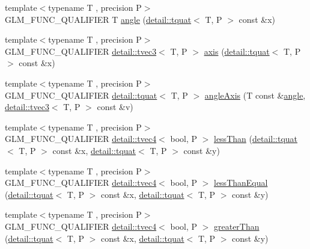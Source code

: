 \begin{DoxyCompactItemize}
\item 
{\footnotesize template$<$typename T , precision P$>$ }\\G\+L\+M\+\_\+\+F\+U\+N\+C\+\_\+\+Q\+U\+A\+L\+I\+F\+I\+ER T \hyperlink{group__gtc__quaternion_ga23a3fc7ada5bbb665ff84c92c6e0542c}{angle} (\hyperlink{structglm_1_1detail_1_1tquat}{detail\+::tquat}$<$ T, P $>$ const \&x)
\item 
{\footnotesize template$<$typename T , precision P$>$ }\\G\+L\+M\+\_\+\+F\+U\+N\+C\+\_\+\+Q\+U\+A\+L\+I\+F\+I\+ER \hyperlink{structglm_1_1detail_1_1tvec3}{detail\+::tvec3}$<$ T, P $>$ \hyperlink{group__gtc__quaternion_ga8eef9f8c3f2e4836dccf09df975b20fb}{axis} (\hyperlink{structglm_1_1detail_1_1tquat}{detail\+::tquat}$<$ T, P $>$ const \&x)
\item 
{\footnotesize template$<$typename T , precision P$>$ }\\G\+L\+M\+\_\+\+F\+U\+N\+C\+\_\+\+Q\+U\+A\+L\+I\+F\+I\+ER \hyperlink{structglm_1_1detail_1_1tquat}{detail\+::tquat}$<$ T, P $>$ \hyperlink{group__gtc__quaternion_ga771b3e16cca8324e7111b923476be666}{angle\+Axis} (T const \&\hyperlink{group__gtc__quaternion_ga23a3fc7ada5bbb665ff84c92c6e0542c}{angle}, \hyperlink{structglm_1_1detail_1_1tvec3}{detail\+::tvec3}$<$ T, P $>$ const \&v)
\item 
{\footnotesize template$<$typename T , precision P$>$ }\\G\+L\+M\+\_\+\+F\+U\+N\+C\+\_\+\+Q\+U\+A\+L\+I\+F\+I\+ER \hyperlink{structglm_1_1detail_1_1tvec4}{detail\+::tvec4}$<$ bool, P $>$ \hyperlink{group__gtc__quaternion_ga4e4c37b86cecde7e1076c5b5fdb920b9}{less\+Than} (\hyperlink{structglm_1_1detail_1_1tquat}{detail\+::tquat}$<$ T, P $>$ const \&x, \hyperlink{structglm_1_1detail_1_1tquat}{detail\+::tquat}$<$ T, P $>$ const \&y)
\item 
{\footnotesize template$<$typename T , precision P$>$ }\\G\+L\+M\+\_\+\+F\+U\+N\+C\+\_\+\+Q\+U\+A\+L\+I\+F\+I\+ER \hyperlink{structglm_1_1detail_1_1tvec4}{detail\+::tvec4}$<$ bool, P $>$ \hyperlink{group__gtc__quaternion_ga313fe20896a8cd43c6d08cc88fa18faa}{less\+Than\+Equal} (\hyperlink{structglm_1_1detail_1_1tquat}{detail\+::tquat}$<$ T, P $>$ const \&x, \hyperlink{structglm_1_1detail_1_1tquat}{detail\+::tquat}$<$ T, P $>$ const \&y)
\item 
{\footnotesize template$<$typename T , precision P$>$ }\\G\+L\+M\+\_\+\+F\+U\+N\+C\+\_\+\+Q\+U\+A\+L\+I\+F\+I\+ER \hyperlink{structglm_1_1detail_1_1tvec4}{detail\+::tvec4}$<$ bool, P $>$ \hyperlink{group__gtc__quaternion_ga63be67bccef0b0ad4e60656223ab3761}{greater\+Than} (\hyperlink{structglm_1_1detail_1_1tquat}{detail\+::tquat}$<$ T, P $>$ const \&x, \hyperlink{structglm_1_1detail_1_1tquat}{detail\+::tquat}$<$ T, P $>$ const \&y)

\end{DoxyCompactItemize}
